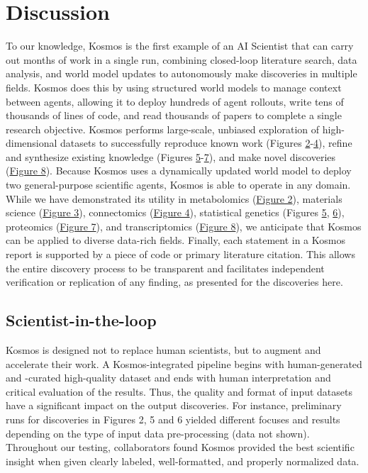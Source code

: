 \documentclass{article}
\begin{document}
\section{Discussion}

To our knowledge, Kosmos is the first example of an AI Scientist that can carry out months of work in a single run, combining closed-loop literature search, data analysis, and world model updates to autonomously make discoveries in multiple fields. Kosmos does this by using structured world models to manage context between agents, allowing it to deploy hundreds of agent rollouts, write tens of thousands of lines of code, and read thousands of papers to complete a single research objective. Kosmos performs large-scale, unbiased exploration of high-dimensional datasets to successfully reproduce known work (Figures \hyperref[fig:fig2]{2}-\hyperref[fig:fig4]{4}), refine and synthesize existing knowledge (Figures \hyperref[fig:fig5]{5}-\hyperref[fig:fig7]{7}), and make novel discoveries (\hyperref[fig:fig8]{Figure 8}). Because Kosmos uses a dynamically updated world model to deploy two general-purpose scientific agents, Kosmos is able to operate in any domain. While we have demonstrated its utility in metabolomics (\hyperref[fig:fig2]{Figure 2}), materials science (\hyperref[fig:fig3]{Figure 3}), connectomics (\hyperref[fig:fig4]{Figure 4}), statistical genetics (Figures \hyperref[fig:fig5]{5}, \hyperref[fig:fig6]{6}), proteomics (\hyperref[fig:fig7]{Figure 7}), and transcriptomics (\hyperref[fig:fig8]{Figure 8}), we anticipate that Kosmos can be applied to diverse data-rich fields. Finally, each statement in a Kosmos report is supported by a piece of code or primary literature citation. This allows the entire discovery process to be transparent and facilitates independent verification or replication of any finding, as presented for the discoveries here.

\subsection{Scientist-in-the-loop}

Kosmos is designed not to replace human scientists, but to augment and accelerate their work. A Kosmos-integrated pipeline begins with human-generated and -curated high-quality dataset and ends with human interpretation and critical evaluation of the results. Thus, the quality and format of input datasets have a significant impact on the output discoveries. For instance, preliminary runs for discoveries in Figures 2, 5 and 6 yielded different focuses and results depending on the type of input data pre-processing (data not shown). Throughout our testing, collaborators found Kosmos provided the best scientific insight when given clearly labeled, well-formatted, and properly normalized data.
\end{document}
